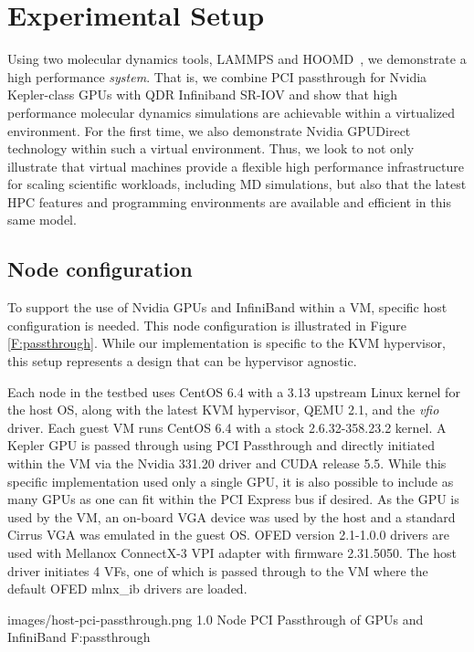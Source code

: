 \documentclass[10pt]{sigplanconf}
\begin{document}
\section{Experimental Setup}\label{setup}

Using two molecular dynamics tools, LAMMPS\cite{plimpton2007lammps} and HOOMD~\cite{anderson2010hoomd}, we demonstrate a high performance \textit{system}.  That is, we combine PCI passthrough for Nvidia Kepler-class GPUs with QDR Infiniband SR-IOV and show that high performance molecular dynamics simulations are achievable within a virtualized environment. 
For the first time, we also demonstrate Nvidia GPUDirect technology within such a virtual environment.  Thus, we look to not only illustrate that virtual machines provide a flexible high performance infrastructure for scaling scientific workloads, including MD simulations, but also that the latest HPC features and programming environments are available and efficient in this same model.   

\subsection{Node configuration}



To support the use of Nvidia GPUs and InfiniBand within a VM, specific host configuration is needed. This node configuration is illustrated in Figure \ref{F:passthrough}.  While our implementation is specific to the KVM hypervisor, this setup represents a design that can be hypervisor agnostic.


Each node in the testbed uses CentOS 6.4 with a 3.13 upstream Linux kernel for the host OS, along with the latest KVM hypervisor, QEMU 2.1, and the \emph{vfio} driver.  Each guest VM runs CentOS 6.4 with a stock 2.6.32-358.23.2 kernel. A Kepler GPU is passed through using PCI Passthrough and directly initiated within the VM via the Nvidia 331.20 driver and CUDA release 5.5. While this specific implementation used only a single GPU, it is also possible to include as many GPUs as one can fit within the PCI Express bus if desired. As the GPU is used by the VM, an on-board VGA device was used by the host and a standard Cirrus VGA was emulated in the guest OS. 
OFED version 2.1-1.0.0 drivers are used with Mellanox ConnectX-3 VPI adapter with firmware 2.31.5050.  The host driver initiates 4 VFs, one of which is passed through to the VM where the default OFED mlnx\_ib drivers are loaded.  

  {images/host-pci-passthrough.png}
  {1.0}
  {Node PCI Passthrough of GPUs and InfiniBand}
  {F:passthrough}
\end{document}
